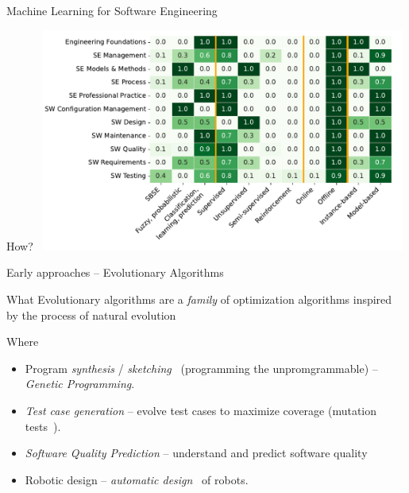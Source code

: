 \documentclass[presentation, 10pt]{beamer}\mode<presentation>{\usetheme{AMSBolognaFC}}
\begin{document}
\begin{frame}{Machine Learning for Software Engineering}
\begin{exampleblock}{How?~\cite{DBLP:journals/csur/KottiGS23}}
\centering
\includegraphics[width=0.9\textwidth]{img/distrubution.png}
\end{exampleblock}
\end{frame}
\begin{frame}{Early approaches -- Evolutionary Algorithms}
\begin{exampleblock}{What}
	Evolutionary algorithms are a \emph{family} of optimization algorithms inspired by the process of natural evolution
\end{exampleblock}
\begin{exampleblock}{Where}
	\begin{itemize}
		\item Program \emph{synthesis} / \emph{sketching}~\cite{lezama2008program} (programming the unpromgrammable) -- \emph{Genetic Programming}.
	
		\item \emph{Test case generation} -- evolve test cases to maximize coverage (mutation tests~\cite{DBLP:journals/infsof/Dominguez-JimenezEGM11}).
		\item \emph{Software Quality Prediction} -- understand and predict software quality~\cite{evett1998gp}
		\item Robotic design -- \emph{automatic design}~\cite{DBLP:journals/swarm/FrancescaBBTB14} of robots. 
	\end{itemize}
\end{exampleblock}
\end{frame}
\end{document}
